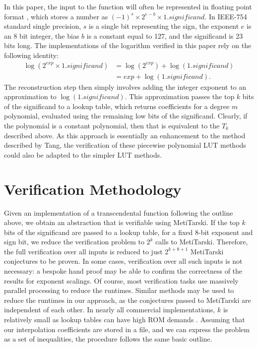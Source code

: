 \documentclass{fac}
\begin{document}
In this paper, the input to the function will often be represented in floating point format \cite{goldberg1991every}, which stores a number as $(-1)^{s} \times 2^{e-b} \times 1.\textit{significand}$. In IEEE-754 standard single precision, $s$ is a single bit representing the sign, the exponent $e$ is an 8 bit integer, the bias $b$ is a constant equal to 127, and the significand is 23 bits long. The implementations of the logarithm verified in this paper rely on the following identity:
\begin{align*}
    \log(2^{\textit{exp}} \times 1.\textit{significand}) &= \log(2^{\textit{exp}}) + \log(1.\textit{significand}) \\
                                                &= \textit{exp} + \log(1.\textit{significand}).
\end{align*}
The reconstruction step then simply involves adding the integer exponent to an approximation to $\log(1.\textit{significand})$. This approximation passes the top $k$ bits of the significand to a lookup table, which returns coefficients for a degree $m$ polynomial, evaluated using the remaining low bits of the significand. Clearly, if the polynomial is a constant polynomial, then that is equivalent to the $T_k$ described above. As this approach is essentially an enhancement to the method described by Tang, the verification of these piecewise polynomial LUT methods could also be adapted to the simpler LUT methods.


\section{Verification Methodology}
\label{Method}
Given an implementation of a transcendental function following the outline above, we obtain an abstraction that is verifiable using MetiTarski. If the top $k$ bits of the significand are passed to a lookup table, for a fixed 8-bit exponent and sign bit, we reduce the verification problem to $2^k$ calls to MetiTarski. Therefore, the  full verification over all inputs is reduced to 
just $2^{k+8+1}$ MetiTarski conjectures to be proven. In some cases, verification over all such inputs is not necessary: a bespoke hand proof may be able to confirm the correctness of the results for exponent scalings. Of course, most verification tasks use massively parallel processing to reduce the runtimes. Similar methods may be used to reduce the runtimes in our approach, as the conjectures passed to MetiTarski are independent of each other. In nearly all commercial implementations, $k$ is relatively small as lookup tables can have high ROM demands \cite{strollo2011elementary}. Assuming that our interpolation coefficients are stored in a file, and we can express the problem as a set of inequalities, the procedure follows the same basic outline. \\
\end{document}

